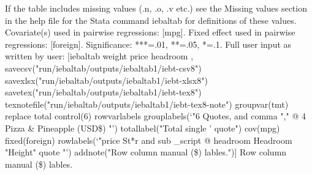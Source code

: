 If the table includes missing values (.n, .o, .v etc.) see the Missing values section in the help file for the Stata command iebaltab for definitions of these values. Covariate(s) used in pairwise regressions: [mpg]. Fixed effect used in pairwise regressions: [foreign]. Significance: ***=.01, **=.05, *=.1. Full user input as written by user: [iebaltab weight price headroom , savecsv("run/iebaltab/outputs/iebaltab1/iebt-csv8") savexlsx("run/iebaltab/outputs/iebaltab1/iebt-xlsx8") savetex("run/iebaltab/outputs/iebaltab1/iebt-tex8") texnotefile("run/iebaltab/outputs/iebaltab1/iebt-tex8-note") groupvar(tmt) replace total control(6) rowvarlabels grouplabels(`"6 Quotes, and comma "," @ 4 Pizza \& Pineapple (USD\$) "') totallabel("Total single ' quote") cov(mpg) fixed(foreign) rowlabels(`"price St*r and sub \_script @ headroom Headroom "Height" quote "') addnote("Row column manual (\$) lables.")] Row column manual (\$) lables.
